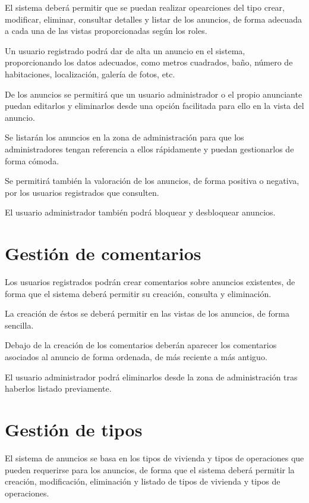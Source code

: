El sistema deber\'{a} permitir que se puedan realizar opearciones del tipo crear, modificar, eliminar, consultar detalles y listar de los anuncios, de forma adecuada a cada una de las vistas proporcionadas seg\'{u}n los roles.

Un usuario registrado podr\'{a} dar de alta un anuncio en el sistema, proporcionando los datos adecuados, como metros cuadrados, ba\~{n}o, n\'{u}mero de habitaciones, localizaci\'{o}n, galer\'{i}a de fotos, etc. 


De los anuncios se permitir\'{a} que un usuario administrador o el propio anunciante puedan editarlos y eliminarlos desde una opci\'{o}n facilitada para ello en la vista del anuncio.


Se listar\'{a}n los anuncios en la zona de administraci\'{o}n para que los administradores tengan referencia a ellos r\'{a}pidamente y puedan gestionarlos de forma c\'{o}moda.

Se permitir\'{a} tambi\'{e}n la valoraci\'{o}n de los anuncios, de forma positiva o negativa, por los usuarios registrados que consulten.


El usuario administrador tambi\'{e}n podr\'{a} bloquear y desbloquear anuncios.

\section{Gesti\'{o}n de comentarios}

Los usuarios registrados podr\'{a}n crear comentarios sobre anuncios existentes, de forma que el sistema deber\'{a} permitir su creaci\'{o}n, consulta y eliminaci\'{o}n.

La creaci\'{o}n de \'{e}stos se deber\'{a} permitir en las vistas de los anuncios, de forma sencilla.

Debajo de la creaci\'{o}n de los comentarios deber\'{a}n aparecer los comentarios asociados al anuncio de forma ordenada, de m\'{a}s reciente a m\'{a}s antiguo.

El usuario administrador podr\'{a} eliminarlos desde la zona de administraci\'{o}n tras haberlos listado previamente.



\section{Gesti\'{o}n de tipos}

El sistema de anuncios se basa en los tipos de vivienda y tipos de operaciones que pueden requerirse para los anuncios, de forma que el sistema deber\'{a} permitir la creaci\'{o}n, modificaci\'{o}n, eliminaci\'{o}n y listado de tipos de vivienda y tipos de operaciones.

